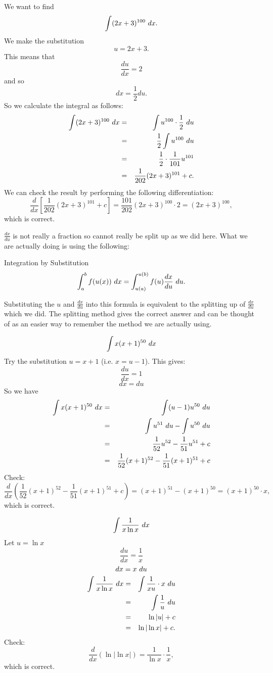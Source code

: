 \begin{example}\label{first-sub-example}
We want to find $$\int(2x+3)^{100}\dx.$$ We make the substitution
\[u=2x+3.\]
This means that \[\frac{du}{dx}=2\] and so \[dx=\frac{1}{2}du.\]
So we calculate the integral as follows:
\begin{eqnarray*}
\int (2x+3)^{100}\dx &=& \int u^{100}\cdot \frac{1}{2}\dx[u] \\
&=& \frac{1}{2}\int u^{100}\dx[u] \\
&=& \frac{1}{2}\cdot\frac{1}{101}u^{101} \\
&=& \frac{1}{202}(2x+3)^{101}+c.
\end{eqnarray*}
We can check the result by performing the following differentiation:
\[\frac{d}{dx}\left[\frac{1}{202}(2x+3)^{101}+c\right]=\frac{101}{202}(2x+3)^{100}\cdot2=(2x+3)^{100},\]
which is correct.
\end{example}

$\frac{dx}{du}$ is not really a fraction so cannot really be split up as we did here. What we are actually doing is using the following:

\begin{thing}{Integration by Substitution}
$$\int_{a}^{b} f(u(x))\dx = \int_{u(a)}^{u(b)} f(u)\frac{dx}{du}\dx[u].$$
\end{thing}

Substituting the $u$ and $\frac{dx}{du}$ into this formula is equivalent to the splitting up of $\frac{dx}{du}$ which we did. The splitting
method gives the correct answer and can be thought of as an easier way to remember the method we are actually using.

\begin{example}
\[\int x(x+1)^{50}\dx\]
Try the substitution $u=x+1$ (i.e. $x=u-1$). This gives:
\[\frac{du}{dx}=1\]
\[dx=du\]
So we have
\begin{eqnarray*}
\int x(x+1)^{50}\dx &=& \int(u-1)u^{50}\dx[u] \\
&=& \int u^{51}\dx[u] -\int u^{50}\dx[u] \\
&=& \frac{1}{52}u^{52}-\frac{1}{51}u^{51}+c \\
&=& \frac{1}{52}(x+1)^{52}-\frac{1}{51}(x+1)^{51}+c
\end{eqnarray*}
Check:
\[\frac{d}{dx}\left(\frac{1}{52}(x+1)^{52}-\frac{1}{51}(x+1)^{51}+c\right)=(x+1)^{51}-(x+1)^{50}=(x+1)^{50}\cdot x,\]
which is correct.
\end{example}

\begin{example}
\[\int\frac{1}{x\ln x}\dx\]
Let $u=\ln x$
\[\frac{du}{dx}=\frac{1}{x}\]
\[dx=x\dx[u]\]
\begin{eqnarray*}
\int \frac{1}{x\ln x}\dx &=& \int\frac{1}{xu}\cdot x\dx[u] \\
&=& \int \frac{1}{u}\dx[u] \\
&=& \ln |u|+c \\
&=& \ln|\ln x|+c.
\end{eqnarray*}
Check:
\[\frac{d}{dx}\left(\ln|\ln x|\right)=\frac{1}{\ln x}\cdot \frac{1}{x},\]
which is correct.
\end{example}


